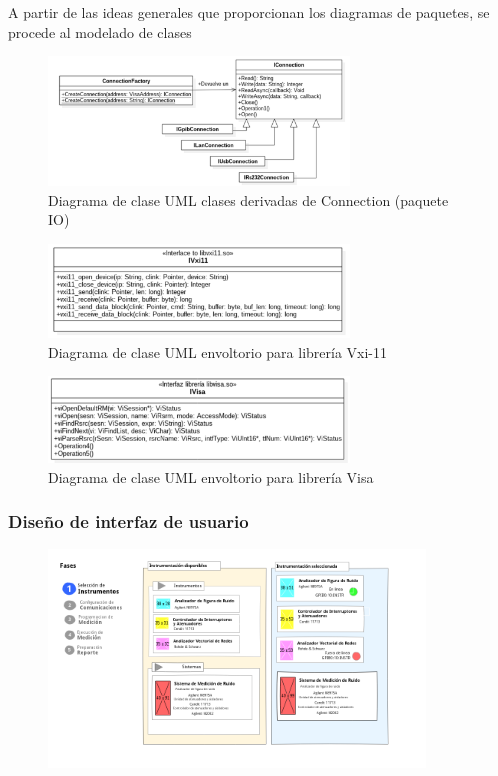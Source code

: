 \documentclass[paper=letter,oneside,fontsize=12pt, parskip=full]{article}
\begin{document}
	A partir de las ideas generales que proporcionan los diagramas de paquetes, se procede al modelado de clases
	
	\begin{figure}[h!]
		\centering
		\includegraphics[width=8cm]{Imagenes/ConnectionClassUml.pdf}
		\caption{Diagrama de clase UML clases derivadas de Connection (paquete IO)}
	\end{figure}
	
	\begin{figure}[h!]
		\centering
		\includegraphics[width=8cm]{Imagenes/Vxi11ClassUml.pdf}
		\caption{Diagrama de clase UML envoltorio para librería Vxi-11}
	\end{figure}	

	\begin{figure}[h!]
		\centering
		\includegraphics[width=8cm]{Imagenes/VisaClassUml.pdf}
		\caption{Diagrama de clase UML envoltorio para librería Visa}
	\end{figure}	
	
	\subsubsection{Diseño de interfaz de usuario}	
	
	\begin{figure}[h!]
		\centering
		\includegraphics[width=10cm]{Imagenes/InstrumentWindowSketchGui.png} 		
	\end{figure}
\end{document}

